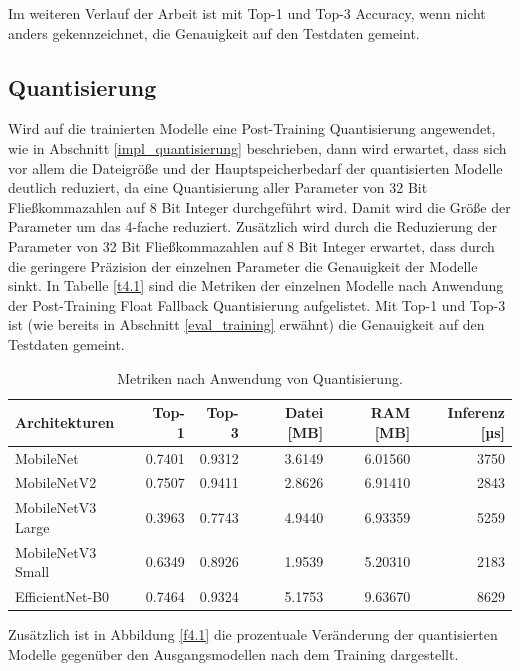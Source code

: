 Im weiteren Verlauf der Arbeit ist mit Top-1 und Top-3 Accuracy, wenn nicht anders gekennzeichnet, die Genauigkeit auf den Testdaten gemeint.


\subsection{Quantisierung}
\label{eval_quantisierung}
Wird auf die trainierten Modelle eine Post-Training Quantisierung angewendet, wie in Abschnitt \ref{impl_quantisierung} beschrieben, dann wird erwartet, dass sich vor allem die Dateigröße und der Hauptspeicherbedarf der quantisierten Modelle deutlich reduziert, da eine Quantisierung aller Parameter von 32 Bit Fließkommazahlen auf 8 Bit Integer durchgeführt wird. Damit wird die Größe der Parameter um das 4-fache reduziert. Zusätzlich wird durch die Reduzierung der Parameter von 32 Bit Fließkommazahlen auf 8 Bit Integer erwartet, dass durch die geringere Präzision der einzelnen Parameter die Genauigkeit der Modelle sinkt. In Tabelle \ref{t4.1} sind die Metriken der einzelnen Modelle nach Anwendung der Post-Training Float Fallback Quantisierung aufgelistet. Mit Top-1 und Top-3 ist (wie bereits in Abschnitt \ref{eval_training} erwähnt) die Genauigkeit auf den Testdaten gemeint.

\begin{table}[ht]
\centering
\begin{tabular}{lrrrrr}
\toprule
    Architekturen &  Top-1 &  Top-3 &  Datei [MB] &  RAM [MB] &  Inferenz [µs] \\
\midrule
        MobileNet & 0.7401 & 0.9312 &      3.6149 &   6.01560 &           3750 \\
      MobileNetV2 & 0.7507 & 0.9411 &      2.8626 &   6.91410 &           2843 \\
MobileNetV3 Large & 0.3963 & 0.7743 &      4.9440 &   6.93359 &           5259 \\
MobileNetV3 Small & 0.6349 & 0.8926 &      1.9539 &   5.20310 &           2183 \\
  EfficientNet-B0 & 0.7464 & 0.9324 &      5.1753 &   9.63670 &           8629 \\
\bottomrule
\end{tabular}
\caption{Metriken nach Anwendung von Quantisierung.}
\label{t4.3}
\end{table}

Zusätzlich ist in Abbildung \ref{f4.1} die prozentuale Veränderung der quantisierten Modelle gegenüber den Ausgangsmodellen nach dem Training dargestellt.

